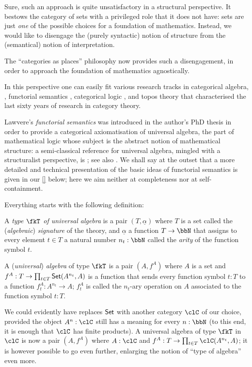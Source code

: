Sure, such an approach is quite unsatisfactory in a structural perspective. It bestows the category of sets with a privileged role that it does not have: sets are just \emph{one} of the possible choices for a foundation of mathematics. Instead, we would like to disengage the (purely syntactic) notion of structure from the (semantical) notion of interpretation.

The ``categories as places'' philosophy now provides such a disengagement, in order to approach the foundation of mathematics agnostically.%

In this perspective one can easily fit various research tracks in categorical algebra, \cite{Janelidze2004}, functorial semantics \cite{lawvere1963functorial,hyland2007category}, categorical logic \cite{lambek1988introduction}, and topos theory \cite{JohnstonePT} that characterised the last sixty years of research in category theory.

Lawvere's \emph{functorial semantics} was introduced in the author's PhD thesis \cite{lawvere1963functorial} in order to provide a categorical axiomatisation of universal algebra, the part of mathematical logic whose subject is the abstract notion of mathematical structure: a semi-classical reference for universal algebra, mingled with a structuralist perspective, is \cite{manes2012algebraic}; see also \cite{sankappanavar}. We shall say at the outset that a more detailed and technical presentation of the basic ideas of functorial semantics is given in our \autoref{} below; here we aim neither at completeness nor at self-containment.

Everything starts with the following definition:
\begin{definition}\label{unialg}
	A \emph{type $\fkT$ of universal algebra} is a pair $(T,\underline{\alpha})$ where $T$ is a set called the (\emph{algebraic}) \emph{signature} of the theory, and $\underline\alpha$ a function $T \to \bbN$ that assigns to every element $t\in T$ a natural number $n_t : \bbN$ called the \emph{arity} of the function symbol $t$.
\end{definition}
\begin{definition}
	A (\emph{universal}) \emph{algebra} of type $\fkT$ is a pair $(A,f^A)$ where $A$ is a set and $f^A : T \to \prod_{t\in T} \mathsf{Set}(A^{n_t},A )$ is a function that sends every function symbol $t : T$ to a function $f^A_t : A^{n_t} \to A$; $f^A_t$ is called the $n_t$-ary operation on $A$ associated to the function symbol $t : T$.
\end{definition}
We could evidently have replaces $\mathsf{Set}$ with another category $\clC$ of our choice, provided the object $A^n : \clC$ still has a meaning for every $n : \bbN$ (to this end, it is enough that $\clC$ has finite products). A universal algebra of type $\fkT$ in $\clC$ is now a pair $(A,f^A)$ where $A : \clC$ and $f^A : T \to \prod_{t\in T} \clC(A^{n_t},A )$; it is however possible to go even further, enlarging the notion of ``type of algebra'' even more.

